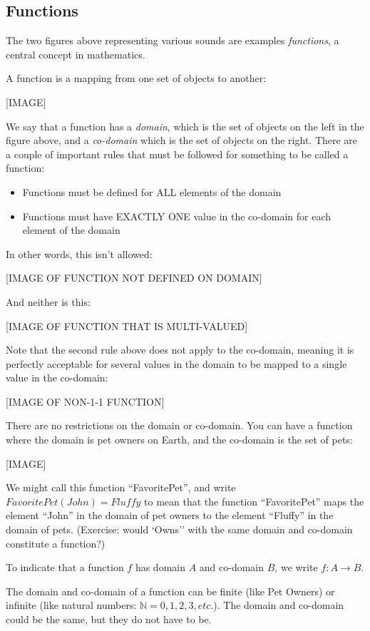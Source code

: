 \documentclass[UTF8]{book}
\begin{document}
\begin{CJK}{UTF8}{gbsn}
\section{Functions}

The two figures above representing various sounds are examples \emph{functions}, a central concept in mathematics.

A function is a mapping from one set of objects to another:

[IMAGE]

We say that a function has a \emph{domain}, which is the set of objects on the left in the figure above, and a \emph{co-domain} which is the set of objects on the right. There are a couple of important rules that must be followed for something to be called a function:

\begin{itemize}
\item Functions must be defined for ALL elements of the domain
\item Functions must have EXACTLY ONE value in the co-domain for each element of the domain
\end{itemize}

In other words, this isn't allowed:

[IMAGE OF FUNCTION NOT DEFINED ON DOMAIN]

And neither is this:

[IMAGE OF FUNCTION THAT IS MULTI-VALUED]

Note that the second rule above does not apply to the co-domain, meaning it is perfectly acceptable for several values in the domain to be mapped to a single value in the co-domain:

[IMAGE OF NON-1-1 FUNCTION]

There are no restrictions on the domain or co-domain. You can have a function where the domain is pet owners on Earth, and the co-domain is the set of pets:

[IMAGE]

We might call this function ``FavoritePet'', and write $FavoritePet(John) = Fluffy$ to mean that the function ``FavoritePet'' maps the element ``John'' in the domain of pet owners to the element ``Fluffy'' in the domain of pets. (Exercise: would `Owns'' with the same domain and co-domain constitute a function?)

To indicate that a function $f$ has domain $A$ and co-domain $B$, we write $f: A \rightarrow B$.

The domain and co-domain of a function can be finite (like Pet Owners) or infinite (like natural numbers: $\mathbb{N} = {0, 1, 2, 3, etc.}$). The domain and co-domain could be the same, but they do not have to be.


\end{CJK}
\end{document}
